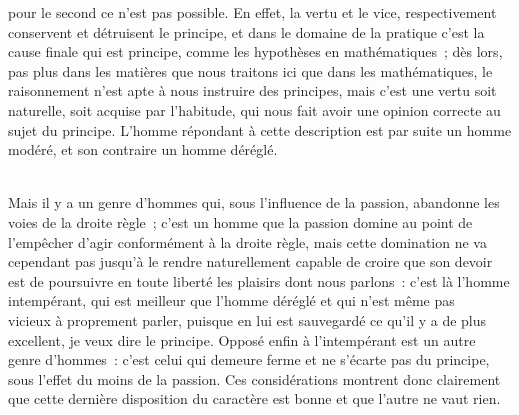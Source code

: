 \documentclass[french,twoside]{book} %
\begin{document}
pour le second ce n’est pas possible. En effet, la vertu et le vice, respectivement conservent et détruisent le principe, et dans le domaine de la pratique c’est la cause finale qui est principe, comme les hypothèses en mathématiques ; dès lors, pas plus dans les matières que nous traitons ici que dans les mathématiques, le raisonnement n’est apte à nous instruire des principes, mais c’est une vertu soit naturelle, soit acquise par l’habitude, qui nous fait avoir une opinion correcte au sujet du principe. L’homme répondant à cette description est par suite un homme modéré, et son contraire un homme déréglé.\par
\\
Mais il y a un genre d’hommes qui, sous l’influence de la passion, abandonne les voies de la droite règle ; c’est un homme que la passion domine au point de l’empêcher d’agir conformément à la droite règle, mais cette domination ne va cependant pas jusqu’à le rendre naturellement capable de croire que son devoir est de poursuivre en toute liberté les plaisirs dont nous parlons : c’est là l’homme intempérant, qui est meilleur que l’homme déréglé et qui n’est même pas \\
vicieux à proprement parler, puisque en lui est sauvegardé ce qu’il y a de plus excellent, je veux dire le principe. Opposé enfin à l’intempérant est un autre genre d’hommes : c’est celui qui demeure ferme et ne s’écarte pas du principe, sous l’effet du moins de la passion. Ces considérations montrent donc clairement que cette dernière disposition du caractère est bonne et que l’autre ne vaut rien.
\end{document}
